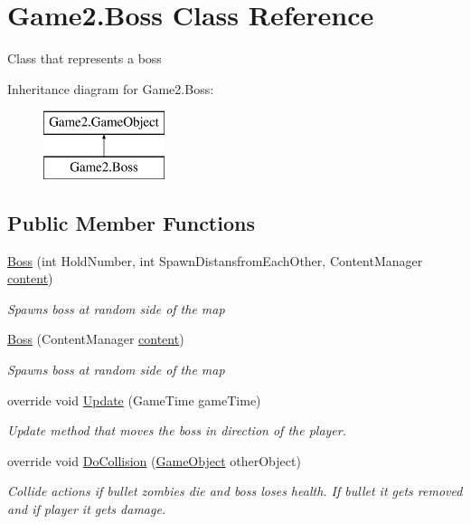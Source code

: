 \hypertarget{class_game2_1_1_boss}{}\section{Game2.\+Boss Class Reference}
\label{class_game2_1_1_boss}


Class that represents a boss  


Inheritance diagram for Game2.\+Boss\+:\begin{figure}[H]
\begin{center}
\leavevmode
\includegraphics[height=2.000000cm]{class_game2_1_1_boss}
\end{center}
\end{figure}
\subsection*{Public Member Functions}
\begin{DoxyCompactItemize}
\item 
\mbox{\hyperlink{class_game2_1_1_boss_ae7aa8e138bbf3cc4ced004d6ef1f82df}{Boss}} (int Hold\+Number, int Spawn\+Distansfrom\+Each\+Other, Content\+Manager \mbox{\hyperlink{class_game2_1_1_game_object_ae8a9e4574e531d2fbb2168a155f2ac53}{content}})
\begin{DoxyCompactList}\small\item\em Spawns boss at random side of the map \end{DoxyCompactList}\item 
\mbox{\hyperlink{class_game2_1_1_boss_aec980cbbd476cb1b9dde1dd901f5d349}{Boss}} (Content\+Manager \mbox{\hyperlink{class_game2_1_1_game_object_ae8a9e4574e531d2fbb2168a155f2ac53}{content}})
\begin{DoxyCompactList}\small\item\em Spawns boss at random side of the map \end{DoxyCompactList}\item 
override void \mbox{\hyperlink{class_game2_1_1_boss_ab120124b7af0edebcb1664e2feaa6590}{Update}} (Game\+Time game\+Time)
\begin{DoxyCompactList}\small\item\em Update method that moves the boss in direction of the player. \end{DoxyCompactList}\item 
override void \mbox{\hyperlink{class_game2_1_1_boss_a8331b445604b8737664d58bf02f82ce1}{Do\+Collision}} (\mbox{\hyperlink{class_game2_1_1_game_object}{Game\+Object}} other\+Object)
\begin{DoxyCompactList}\small\item\em Collide actions if bullet zombies die and boss loses health. If bullet it gets removed and if player it gets damage. \end{DoxyCompactList}\end{DoxyCompactItemize}

